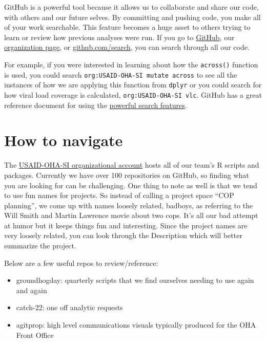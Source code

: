 \documentclass[
  letterpaper,
  DIV=11,
  numbers=noendperiod]{scrreprt}
\providecommand{\tightlist}{%
  \setlength{\itemsep}{0pt}\setlength{\parskip}{0pt}}\usepackage{longtable,booktabs,array}
\begin{document}
GitHub is a powerful tool because it allows us to collaborate and share
our code, with others and our future selves. By committing and pushing
code, you make all of your work searchable. This feature becomes a huge
asset to others trying to learn or review how previous analyses were
run. If you go to \href{github.com}{GitHub}, our
\href{https://github.com/USAID-OHA-SI}{organization page}, or
\url{github.com/search}, you can search through all our code.

For example, if you were interested in learning about how the
\texttt{across()} function is used, you could search
\texttt{org:USAID-OHA-SI\ mutate\ across} to see all the instances of
how we are applying this function from \texttt{dplyr} or you could
search for how viral load coverage is calculated,
\texttt{org:USAID-OHA-SI\ vlc}. GitHub has a great reference document
for using the
\href{https://docs.github.com/en/search-github/github-code-search/understanding-github-code-search-syntax}{powerful
search features}.

\hypertarget{how-to-navigate}{%
\section{How to navigate}\label{how-to-navigate}}

The \href{https://github.com/USAID-OHA-SI}{USAID-OHA-SI organizational
account} hosts all of our team's R scripts and packages. Currently we
have over 100 repositories on GitHub, so finding what you are looking
for can be challenging. One thing to note as well is that we tend to use
fun names for projects. So instead of calling a project space ``COP
planning'', we come up with names loosely related, badboys, as referring
to the Will Smith and Martin Lawrence movie about two cops. It's all our
bad attempt at humor but it keeps things fun and interesting. Since the
project names are very loosely related, you can look through the
Description which will better summarize the project.

Below are a few useful repos to review/reference:

\begin{itemize}
\tightlist
\item
  groundhogday: quarterly scripts that we find ourselves needing to use
  again and again
\item
  catch-22: one off analytic requests
\item
  agitprop: high level communications visuals typically produced for the
  OHA Front Office
\end{itemize}
\end{document}
